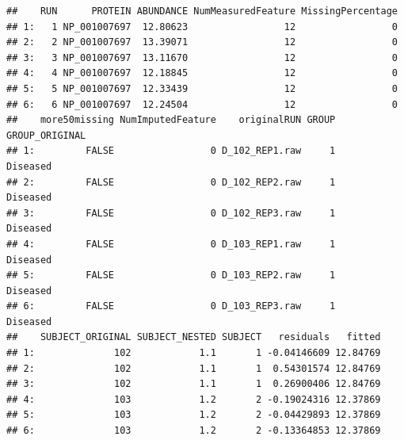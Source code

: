 \documentclass[]{book}
\newenvironment{Shaded}{\begin{snugshade}}{\end{snugshade}}
\newcommand{\CommentTok}[1]{\textcolor[rgb]{0.56,0.35,0.01}{\textit{#1}}}
\newcommand{\KeywordTok}[1]{\textcolor[rgb]{0.13,0.29,0.53}{\textbf{#1}}}
\newcommand{\NormalTok}[1]{#1}
\newcommand{\OperatorTok}[1]{\textcolor[rgb]{0.81,0.36,0.00}{\textbf{#1}}}
\begin{document}
\begin{Shaded}
\end{Shaded}

\begin{verbatim}
##    RUN      PROTEIN ABUNDANCE NumMeasuredFeature MissingPercentage
## 1:   1 NP_001007697  12.80623                 12                 0
## 2:   2 NP_001007697  13.39071                 12                 0
## 3:   3 NP_001007697  13.11670                 12                 0
## 4:   4 NP_001007697  12.18845                 12                 0
## 5:   5 NP_001007697  12.33439                 12                 0
## 6:   6 NP_001007697  12.24504                 12                 0
##    more50missing NumImputedFeature    originalRUN GROUP GROUP_ORIGINAL
## 1:         FALSE                 0 D_102_REP1.raw     1       Diseased
## 2:         FALSE                 0 D_102_REP2.raw     1       Diseased
## 3:         FALSE                 0 D_102_REP3.raw     1       Diseased
## 4:         FALSE                 0 D_103_REP1.raw     1       Diseased
## 5:         FALSE                 0 D_103_REP2.raw     1       Diseased
## 6:         FALSE                 0 D_103_REP3.raw     1       Diseased
##    SUBJECT_ORIGINAL SUBJECT_NESTED SUBJECT   residuals   fitted
## 1:              102            1.1       1 -0.04146609 12.84769
## 2:              102            1.1       1  0.54301574 12.84769
## 3:              102            1.1       1  0.26900406 12.84769
## 4:              103            1.2       2 -0.19024316 12.37869
## 5:              103            1.2       2 -0.04429893 12.37869
## 6:              103            1.2       2 -0.13364853 12.37869
\end{verbatim}

\begin{Shaded}
\end{Shaded}
\end{document}
